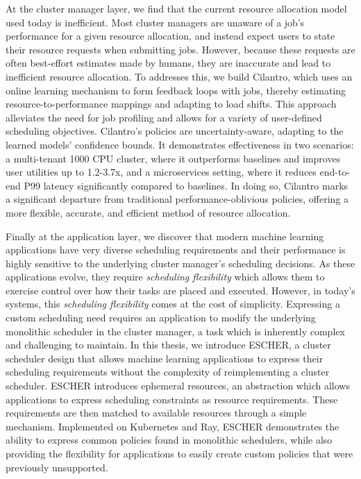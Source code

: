 At the cluster manager layer, we find that the current resource allocation model used today is inefficient. Most cluster managers are unaware of a job's performance for a given resource allocation, and instead expect users to state their resource requests when submitting jobs. However, because these requests are often best-effort estimates made by humans, they are inaccurate and lead to inefficient resource allocation. To addresses this, we build Cilantro, which uses an online learning mechanism to form feedback loops with jobs, thereby estimating resource-to-performance mappings and adapting to load shifts. This approach alleviates the need for job profiling and allows for a variety of user-defined scheduling objectives. Cilantro's policies are uncertainty-aware, adapting to the learned models' confidence bounds. It demonstrates effectiveness in two scenarios: a multi-tenant 1000 CPU cluster, where it outperforms baselines and improves user utilities up to 1.2-3.7x, and a microservices setting, where it reduces end-to-end P99 latency significantly compared to baselines. In doing so, Cilantro marks a significant departure from traditional performance-oblivious policies, offering a more flexible, accurate, and efficient method of resource allocation.

Finally at the application layer, we discover that modern machine learning applications have very diverse scheduling requirements and their performance is highly sensitive to the underlying cluster manager's scheduling decisions.  As these applications evolve, they require \textit{scheduling flexibility} which allows them to exercise control over how their tasks are placed and executed. However, in today's systems, this \textit{scheduling flexibility} comes at the cost of simplicity. Expressing a custom scheduling need requires an application to modify the underlying monolithic scheduler in the cluster manager, a task which is inherently complex and challenging to maintain. In this thesis, we introduce ESCHER, a cluster scheduler design that allows machine learning applications to express their scheduling requirements without the complexity of reimplementing a cluster scheduler. ESCHER introduces ephemeral resources, an abstraction which allows applications to express scheduling constraints as resource requirements. These requirements are then matched to available resources through a simple mechanism. Implemented on Kubernetes and Ray, ESCHER demonstrates the ability to express common policies found in monolithic schedulers, while also providing the flexibility for applications to easily create custom policies that were previously unsupported. %



